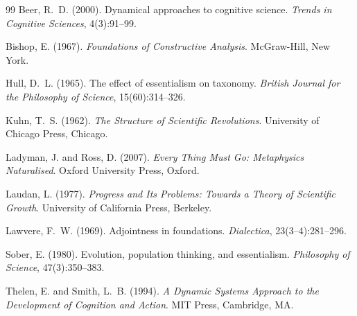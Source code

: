 \documentclass[12pt, a4paper]{article}
\theoremstyle{plain}
\theoremstyle{definition}
\theoremstyle{remark}
\begin{document}
\begin{thebibliography}{99}
Beer, R.~D. (2000). Dynamical approaches to cognitive science.
\textit{Trends in Cognitive Sciences}, 4(3):91--99.

Bishop, E. (1967). \textit{Foundations of Constructive Analysis}.
McGraw-Hill, New York.

Hull, D.~L. (1965). The effect of essentialism on taxonomy.
\textit{British Journal for the Philosophy of Science}, 15(60):314--326.

Kuhn, T.~S. (1962). \textit{The Structure of Scientific Revolutions}.
University of Chicago Press, Chicago.

Ladyman, J. and Ross, D. (2007). \textit{Every Thing Must Go: Metaphysics
Naturalised}. Oxford University Press, Oxford.

Laudan, L. (1977). \textit{Progress and Its Problems: Towards a Theory of
Scientific Growth}. University of California Press, Berkeley.

Lawvere, F.~W. (1969). Adjointness in foundations. \textit{Dialectica},
23(3--4):281--296.

Sober, E. (1980). Evolution, population thinking, and essentialism.
\textit{Philosophy of Science}, 47(3):350--383.

Thelen, E. and Smith, L.~B. (1994). \textit{A Dynamic Systems Approach
to the Development of Cognition and Action}. MIT Press, Cambridge, MA.

\end{thebibliography}
\end{document}
